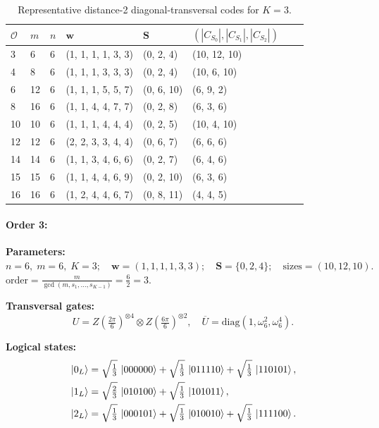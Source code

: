 \documentclass[pdflatex,sn-nature]{sn-jnl}%
\theoremstyle{thmstyleone}%
\theoremstyle{thmstyletwo}%
\theoremstyle{thmstylethree}%
\begin{document}
\begin{appendices}
\begin{table}[t]
  \caption{Representative distance-2 diagonal-transversal codes for $K=3$.}
  \label{tab:K=3}
  \begin{tabular*}{\textwidth}{@{\extracolsep{\fill}}llllllll}
    \toprule
    $\mathcal{O}$ & $m$ & $n$ & $\mathbf w$
    & $\mathbf S$ & $(|C_{S_{0}}|,|C_{S_{1}}|, |C_{S_{2}}|)$ \\
    \midrule
    3   & 6   & 6 & (1, 1, 1, 1, 3, 3)        & (0, 2, 4)  & (10, 12, 10)   \\
    4   & 8   & 6 & (1, 1, 1, 3, 3, 3)        & (0, 2, 4)  & (10, 6, 10) \\
    6   & 12  & 6 & (1, 1, 1, 5, 5, 7)        & (0, 6, 10) & (6, 9, 2) \\
    8   & 16  & 6 & (1, 1, 4, 4, 7, 7)        & (0, 2, 8)  & (6, 3, 6)  \\
    10  & 10  & 6 & (1, 1, 1, 4, 4, 4)        & (0, 2, 5)  & (10, 4, 10) \\
    12  & 12  & 6 & (2, 2, 3, 3, 4, 4)        & (0, 6, 7)  & (6, 6, 6) \\
    14  & 14  & 6 & (1, 1, 3, 4, 6, 6)        & (0, 2, 7)  & (6, 4, 6) \\
    15  & 15  & 6 & (1, 1, 4, 4, 6, 9)        & (0, 2, 10) & (6, 3, 6) \\
    16  & 16  & 6 & (1, 2, 4, 4, 6, 7)        & (0, 8, 11) & (4, 4, 5) \\
    \bottomrule
  \end{tabular*}
\end{table}


\paragraph{\textbf{Order 3:}}
\noindent\textbf{Parameters:} $n=6,\; m=6,\; K=3;\quad \mathbf w=(1, 1, 1, 1, 3, 3);\quad \mathbf S=\{0, 2, 4\};\quad \text{sizes}=\left(10, 12, 10\right).$ $\displaystyle \text{order}=\frac{m}{\gcd(m,s_1,\dots,s_{K-1})}=\frac{6}{2}=3.$

\noindent\textbf{Transversal gates:}
\[
    U=Z \left(\tfrac{2\pi}{6}\right)^{\otimes4} \otimes Z \left(\tfrac{6\pi}{6}\right)^{\otimes2},\quad
    \overline U=\mathrm{diag}(1,\omega_6^{2},\omega_6^{4}).
\]

\noindent\textbf{Logical states:}
\begin{align*}
    &\ket{0_L} = \sqrt{\tfrac{1}{3}}\,\ket{000000} + \sqrt{\tfrac{1}{3}}\,\ket{011110} + \sqrt{\tfrac{1}{3}}\,\ket{110101}, \\
    &\ket{1_L} = \sqrt{\tfrac{2}{3}}\,\ket{010100} + \sqrt{\tfrac{1}{3}}\,\ket{101011}, \\
    &\ket{2_L} = \sqrt{\tfrac{1}{3}}\,\ket{000101} + \sqrt{\tfrac{1}{3}}\,\ket{010010} + \sqrt{\tfrac{1}{3}}\,\ket{111100}.
\end{align*}


\end{appendices}
\end{document}
